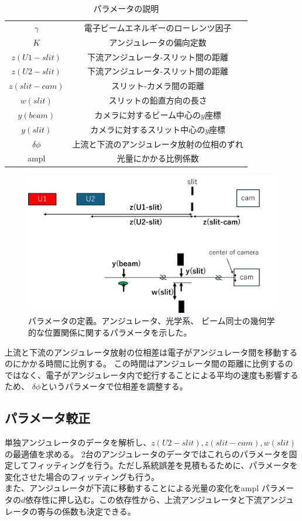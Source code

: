 \documentclass[a4paper,11pt,uplatex]{jsbook}
\begin{document}
\begin{table}[h]
\centering
\begin{tabular}{c|c}
  $\gamma$ & 電子ビームエネルギーのローレンツ因子 \\
  $K$ & アンジュレータの偏向定数 \\
  $z(U1-slit)$ & 下流アンジュレータ-スリット間の距離\\
  $z(U2-slit)$ & 下流アンジュレータ-スリット間の距離 \\
  $z(slit-cam)$ & スリット-カメラ間の距離 \\
  $w(slit)$ & スリットの鉛直方向の長さ \\
  $y(beam)$ & カメラに対するビーム中心の$y$座標 \\
  $y(slit)$ & カメラに対するスリット中心の$y$座標 \\
  $\delta \phi$ & 上流と下流のアンジュレータ放射の位相のずれ\\
  ampl & 光量にかかる比例係数
\end{tabular}
\caption[パラメータの説明]{パラメータの説明}\label{tab:prm}
\end{table}
\begin{figure}[h]
  \centering
  \includegraphics[width=0.8\linewidth]{image/4-prm.png}
  \caption[パラメータの定義]{パラメータの定義。アンジュレータ、光学系、
  ビーム同士の幾何学的な位置関係に関するパラメータを示した。}\label{prm}
\end{figure}
上流と下流のアンジュレータ放射の位相差は電子がアンジュレータ間を移動するのにかかる時間に比例する。
この時間はアンジュレータ間の距離に比例するのではなく、電子がアンジュレータ内で蛇行することによる平均の速度も影響するため、
$\delta \phi$というパラメータで位相差を調整する。


\subsection{パラメータ較正}
単独アンジュレータのデータを解析し、$z(U2- slit),z(slit-cam),w(slit)$の最適値を求める。
2台のアンジュレータのデータではこれらのパラメータを固定してフィッティングを行う。ただし系統誤差を見積もるために、パラメータを変化させた場合のフィッティングも行う。\\
また、アンジュレータが下流に移動することによる光量の変化をampl パラメータの$d$依存性に押し込む。この依存性から、上流アンジュレータと下流アンジュレータの寄与の係数も決定できる。
\end{document}

